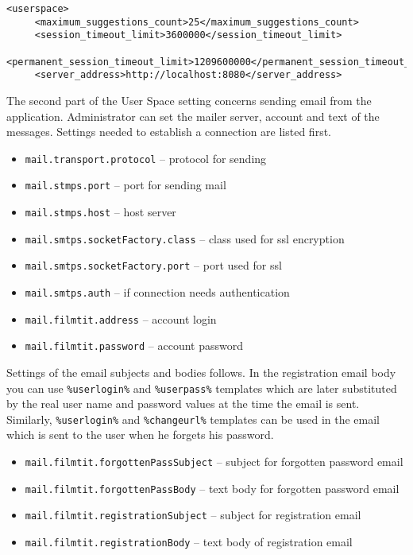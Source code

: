 \begin{lstlisting}
<userspace>
     <maximum_suggestions_count>25</maximum_suggestions_count>
     <session_timeout_limit>3600000</session_timeout_limit>
     <permanent_session_timeout_limit>1209600000</permanent_session_timeout_limit>
     <server_address>http://localhost:8080</server_address>
\end{lstlisting}


The second part of the User Space setting concerns sending email from the application. Administrator can set the mailer server, account and text of the messages. Settings needed to establish a connection are listed first.

\begin{itemize}
   \item \verb#mail.transport.protocol# -- protocol for sending
   \item \verb#mail.stmps.port# -- port for sending mail
   \item \verb#mail.stmps.host# -- host server
	\item \verb#mail.smtps.socketFactory.class# -- class used for ssl encryption
	\item \verb#mail.smtps.socketFactory.port# -- port used for ssl
	\item \verb#mail.smtps.auth# -- if connection needs authentication
	\item \verb#mail.filmtit.address# -- account login
	\item \verb#mail.filmtit.password# -- account password
\end{itemize}

Settings of the email subjects and bodies follows. In the registration email body you can use {\tt \%userlogin\%} and {\tt \%userpass\%} templates which are later substituted by the real user name and password values at the time the email is sent. Similarly, {\tt \%userlogin\%} and {\tt \%changeurl\%} templates can be used in the email which is sent to the user when he forgets his password.

\begin{itemize}
\item \verb#mail.filmtit.forgottenPassSubject# -- subject for forgotten password email
\item \verb#mail.filmtit.forgottenPassBody# -- text body for forgotten password email
\item \verb#mail.filmtit.registrationSubject# -- subject for registration email
\item \verb#mail.filmtit.registrationBody# -- text body of registration email
\end{itemize}

